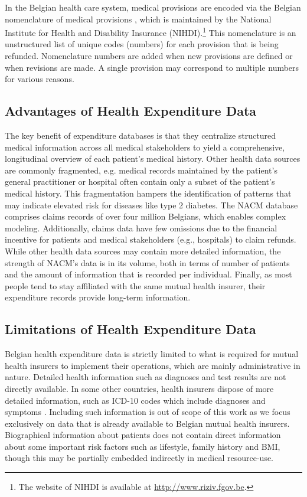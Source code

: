 \documentclass[twoside,11pt]{article}
\newcommand{\todo}[1]{\textbf{\color{red}#1}}
\begin{document}
In the Belgian health care system, medical provisions are encoded via the Belgian nomenclature of medical provisions \citep{van2008financing}, which is maintained by the National Institute for Health and Disability Insurance (NIHDI).\footnote{The website of NIHDI is available at \url{http://www.riziv.fgov.be}.} This nomenclature is an unstructured list of unique codes (numbers) for each provision that is being refunded. Nomenclature numbers are added when new provisions are defined or when revisions are made. A single provision may correspond to multiple numbers for various reasons.

\subsection{Advantages of Health Expenditure Data}
The key benefit of expenditure databases is that they centralize structured medical information across all medical stakeholders to yield a comprehensive, longitudinal overview of each patient's medical history. Other health data sources are commonly fragmented, e.g. medical records maintained by the patient's general practitioner or hospital often contain only a subset of the patient's medical history. This fragmentation hampers the identification of patterns that may indicate elevated risk for diseases like type 2 diabetes. The NACM database comprises claims records of over four million Belgians, which enables complex modeling. Additionally, claims data have few omissions due to the financial incentive for patients and medical stakeholders (e.g., hospitals) to claim refunds. While other health data sources may contain more detailed information, the strength of NACM's data is in its volume, both in terms of number of patients and the amount of information that is recorded per individual. Finally, as most people tend to stay affiliated with the same mutual health insurer, their expenditure records provide long-term information.

\subsection{Limitations of Health Expenditure Data}
Belgian health expenditure data is strictly limited to what is required for mutual health insurers to implement their operations, which are mainly administrative in nature. Detailed health information such as diagnoses and test results are not directly available. In some other countries, health insurers dispose of more detailed information, such as ICD-10 codes which include diagnoses and symptoms \citep{world2012international}. Including such information is out of scope of this work as we focus exclusively on data that is already available to Belgian mutual health insurers. Biographical information about patients does not contain direct information about some important risk factors such as lifestyle, family history and BMI, though this may be partially embedded indirectly in medical resource-use. %
\end{document}
